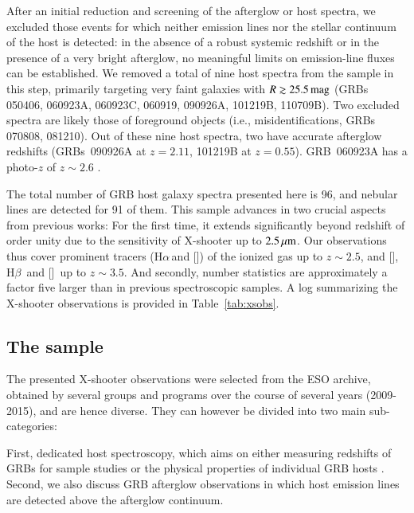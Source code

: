 \documentclass[traditabstract, longauth]{aa}
\newcommand{\hb}{H$\beta$}
\newcommand{\ha}{H$\alpha$}
\newcommand{\oii}{[\ion{O}{ii}]}
\newcommand{\oiii}{[\ion{O}{iii}]}
\newcommand{\nii}{[\ion{N}{ii}]}
\begin{document}
After an initial reduction and screening of the afterglow or host spectra, we excluded those events for which neither emission lines nor the stellar continuum of the host is detected: in the absence of a robust systemic redshift or in the presence of a very bright afterglow, no meaningful limits on emission-line fluxes can be established.  {We removed a total of nine host spectra from the sample in this step, primarily targeting very faint galaxies with $R\gtrsim25.5\,\rm{mag}$ (GRBs 050406, 060923A, 060923C, 060919, 090926A, 101219B, 110709B). Two excluded spectra are likely those of foreground objects (i.e., misidentifications, GRBs 070808, 081210). Out of these nine host spectra, two have accurate afterglow redshifts (GRBs~090926A at $z=2.11$, 101219B at $z=0.55$). GRB~060923A has a photo-$z$ of $z\sim2.6$ \citep{2008MNRAS.388.1743T, 2013ApJ...778..128P}.}

The total number of GRB host galaxy spectra presented here is 96, and nebular lines are detected for 91 of them. This sample advances in two crucial aspects from previous works: For the first time, it extends significantly beyond redshift of order unity due to the sensitivity of X-shooter up to $2.5\,\rm{\mu m}$. Our observations thus cover prominent tracers (\ha\,and \nii) of the ionized gas up to $z\sim2.5$, and \oii, \hb\, and \oiii\, up to $z\sim3.5$. And secondly, number statistics are approximately a factor five larger than in previous spectroscopic samples. A log summarizing the X-shooter observations is provided in Table~\ref{tab:xsobs}.

\subsection{The sample}

The presented X-shooter observations were selected from the ESO archive, obtained by several groups and programs over the course of several years (2009-2015), and are hence diverse. They can however be divided into two main sub-categories: 

First, dedicated host spectroscopy, which aims on either measuring redshifts of GRBs for sample studies \citep[e.g.,][]{2012ApJ...758...46K, 2012ApJ...749...68S} or the physical properties of individual GRB hosts \citep[e.g.,][]{2011A&A...535A.127V, 2012A&A...546A...8K}. Second, we also discuss GRB afterglow observations in which host emission lines are detected above the afterglow continuum. 
\end{document}
